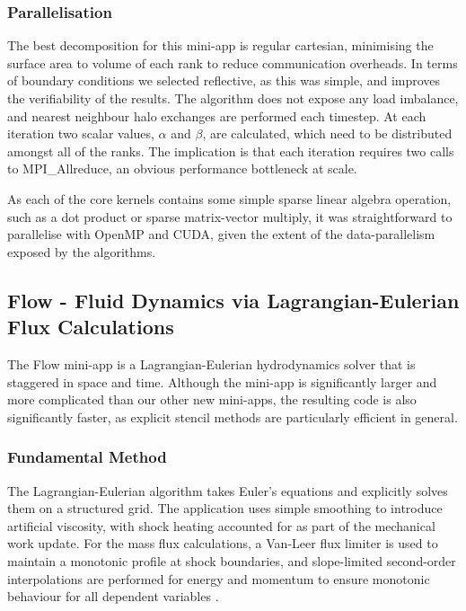 \documentclass[runningheads,a4paper]{llncs}
\begin{document}
\subsubsection{Parallelisation}

The best decomposition for this mini-app is regular cartesian, minimising the surface area to volume of each rank to reduce communication overheads. In terms of boundary conditions we selected reflective, as this was simple, and improves the verifiability of the results. The algorithm does not expose any load imbalance, and nearest neighbour halo exchanges are performed each timestep. At each iteration two scalar values, $\alpha$ and $\beta$, are calculated, which need to be distributed amongst all of the ranks. The implication is that each iteration requires two calls to MPI\_Allreduce, an obvious performance bottleneck at scale. 

As each of the core kernels contains some simple sparse linear algebra operation, such as a dot product or sparse matrix-vector multiply, it was straightforward to parallelise with OpenMP and CUDA, given the extent of the data-parallelism exposed by the algorithms.

\subsection{Flow - Fluid Dynamics via Lagrangian-Eulerian Flux Calculations}

\label{sec:flow}

The Flow mini-app is a Lagrangian-Eulerian hydrodynamics solver that is staggered in space and time. Although the mini-app is significantly larger and more complicated than our other new mini-apps, the resulting code is also significantly faster, as explicit stencil methods are particularly efficient in general.

\subsubsection{Fundamental Method}

The Lagrangian-Eulerian algorithm takes Euler's equations and explicitly solves them on a structured grid. The application uses simple smoothing to introduce artificial viscosity, with shock heating accounted for as part of the mechanical work update. For the mass flux calculations, a Van-Leer flux limiter is used to maintain a monotonic profile at shock boundaries, and slope-limited second-order interpolations are performed for energy and momentum to ensure monotonic behaviour for all dependent variables \cite{}.
\end{document}
